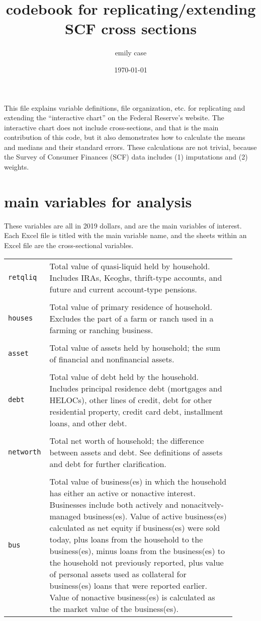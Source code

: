 \documentclass[12pt]{article}
\title{codebook for replicating/extending SCF cross sections}
\author{emily case}
\date{\today}
\begin{document}
\maketitle

This file explains variable definitions, file organization, etc. for replicating and extending the ``interactive chart'' on the Federal Reserve's website. The interactive chart does not include cross-sections, and that is the main contribution of this code, but it also demonstrates how to calculate the means and medians and their standard errors. These calculations are not trivial, because the Survey of Consumer Finances (SCF) data includes (1) imputations and (2) weights. 
\section{main variables for analysis}
These variables are all in 2019 dollars, and are the main variables of interest. Each Excel file is titled with the main variable name, and the sheets within an Excel file are the cross-sectional variables. 

\begin{table}[h!]
	\begin{tabular}{p{0.1\linewidth} p{0.8\linewidth}}
		\texttt{retqliq} & Total value of quasi-liquid held by household. Includes IRAs, Keoghs, thrift-type accounts, and future and current account-type pensions.	\\\\
		\texttt{houses} & Total value of primary residence of household. Excludes the part of a farm or ranch used in a farming or ranching business.	\\\\
		\texttt{asset} & Total value of assets held by household; the sum of financial and nonfinancial assets. 	\\\\
		\texttt{debt} & Total value of debt held by the household. Includes principal residence debt (mortgages and HELOCs), other lines of credit, debt for other residential property, credit card debt, installment loans, and other debt.	\\\\
		\texttt{networth} & Total net worth of household; the difference between assets and debt. See definitions of assets and debt for further clarification.\\\\
		\texttt{bus} & Total value of business(es) in which the household has either an active or nonactive interest. Businesses include both actively and nonacitvely-managed business(es). Value of active business(es) calculated as net equity if business(es) were sold today, plus loans from the household to the business(es), minus loans from the business(es) to the household not previously reported, plus value of personal assets used as collateral for business(es) loans that were reported earlier. Value of nonactive business(es) is calculated as the market value of the business(es).\\
	\end{tabular}
\end{table}
\end{document}
